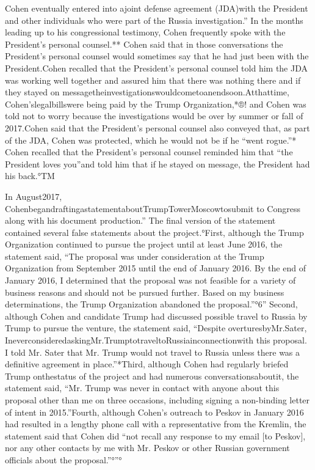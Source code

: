 Cohen eventually entered into ajoint defense agreement (JDA)with the President and other individuals who were part of the Russia investigation.” In the months leading up to his congressional testimony, Cohen frequently spoke with the President's personal counsel.** Cohen said that in those conversations the President's personal counsel would sometimes say that he had just been with the President.Cohen recalled that the President's personal counsel told him the JDA was working well together and assured him that there was nothing there and if they stayed on messagetheinvestigationswouldcometoanendsoon.Atthattime, Cohen'slegalbillswere being paid by the Trump Organization,*®! and Cohen was told not to worry because the investigations would be over by summer or fall of 2017.Cohen said that the President's personal counsel also conveyed that, as part of the JDA, Cohen was protected, which he would not be if he “went rogue.”* Cohen recalled that the President's personal counsel reminded him that “the President loves you”and told him that if he stayed on message, the President had his back.°TM

In August2017, CohenbegandraftingastatementaboutTrumpTowerMoscowtosubmit to Congress along with his document production.” The final version of the statement contained several false statements about the project.°First, although the Trump Organization continued to pursue the project until at least June 2016, the statement said, “The proposal was under consideration at the Trump Organization from September 2015 until the end of January 2016. By the end of January 2016, I determined that the proposal was not feasible for a variety of business reasons and should not be pursued further. Based on my business determinations, the Trump Organization abandoned the proposal.”°6” Second, although Cohen and candidate Trump had discussed possible travel to Russia by Trump to pursue the venture, the statement said, “Despite overturesbyMr.Sater, IneverconsideredaskingMr.TrumptotraveltoRussiainconnectionwith this proposal. I told Mr. Sater that Mr. Trump would not travel to Russia unless there was a definitive agreement in place.”*Third, although Cohen had regularly briefed Trump onthestatus of the project and had numerous conversationsaboutit, the statement said, “Mr. Trump was never in contact with anyone about this proposal other than me on three occasions, including signing a non-binding letter of intent in 2015.”Fourth, although Cohen's outreach to Peskov in January 2016 had resulted in a lengthy phone call with a representative from the Kremlin, the statement said that Cohen did “not recall any response to my email [to Peskov], nor any other contacts by me with Mr. Peskov or other Russian government officials about the proposal.”°”°

